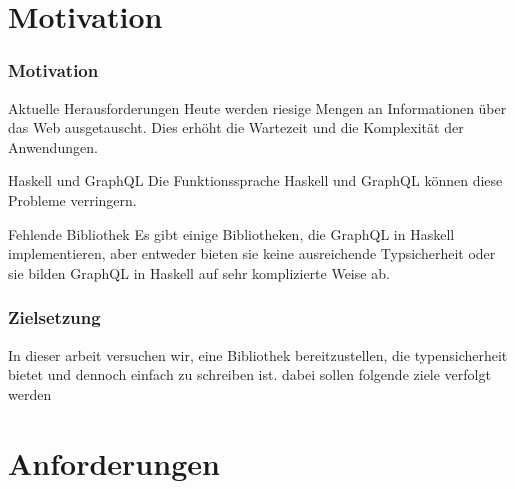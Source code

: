 
\section{Motivation}

\begin{frame}{}
    \frametitle{Motivation}

    \footnotesize

    \begin{alertblock}{Aktuelle Herausforderungen}
        Heute werden riesige Mengen an Informationen über das Web ausgetauscht. Dies erhöht die \alert{Wartezeit} und die \alert{Komplexität} der Anwendungen. 
    \end{alertblock}

    \begin{alertblock}{Haskell und  GraphQL}
        Die Funktionssprache Haskell und GraphQL können diese Probleme verringern.
    \end{alertblock}

    \begin{block}{Fehlende Bibliothek}
        Es gibt einige Bibliotheken, die GraphQL in Haskell implementieren, aber entweder bieten sie keine ausreichende Typsicherheit oder sie bilden GraphQL in Haskell auf sehr komplizierte Weise ab. 
    \end{block}

\end{frame}

\begin{frame}
    \frametitle{Zielsetzung}

    In dieser arbeit versuchen wir, eine Bibliothek bereitzustellen,
    die \alert{typensicherheit bietet} und dennoch \alert{einfach zu schreiben} ist. 
    dabei sollen folgende ziele verfolgt werden

\end{frame}



\section{Anforderungen}

